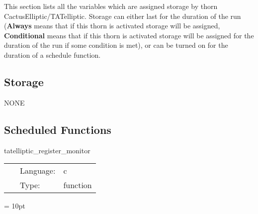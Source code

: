 \noindent This section lists all the variables which are assigned storage by thorn CactusElliptic/TATelliptic.  Storage can either last for the duration of the run ({\bf Always} means that if this thorn is activated storage will be assigned, {\bf Conditional} means that if this thorn is activated storage will be assigned for the duration of the run if some condition is met), or can be turned on for the duration of a schedule function.


\subsection*{Storage}NONE
\subsection*{Scheduled Functions}
\vspace{5mm}


\hspace{5mm} tatelliptic\_register\_monitor 

\hspace{5mm}{\it register the pseudo solver } 


\hspace{5mm}

 \begin{tabular*}{160mm}{cll} 
~ & Language:  & c \\ 
~ & Type:  & function \\ 
\end{tabular*} 



\vspace{5mm}\parskip = 10pt 

